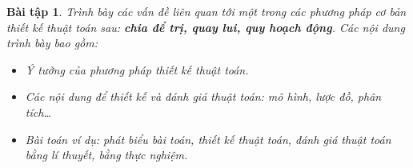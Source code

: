 \documentclass[14pt, a4paper]{article}
\theoremstyle{sltheorem}
\newtheorem{baitap}{Bài tập}
\theoremstyle{soltheorem}
\begin{document}
\begin{titlepage}






        \vfill %

    \end{titlepage}

    \nocite{*}

    \newpage

    \begin{baitap}
        Trình bày các vấn đề liên quan tới một trong các phương pháp cơ bản thiết kế
        thuật toán sau: \textbf{chia để trị, quay lui, quy hoạch động}. Các nội dung trình bày bao gồm:
        \begin{itemize} [label={$-$}]
            \item Ý tưởng của phương pháp thiết kế thuật toán.
            \item Các nội dung để thiết kế và đánh giá thuật toán: mô hình, lược đồ, phân tích…
            \item Bài toán ví dụ: phát biểu bài toán, thiết kế thuật toán, đánh giá thuật toán
            bằng lí thuyết, bằng thực nghiệm.
        \end{itemize}
    \end{baitap}
\end{document}
